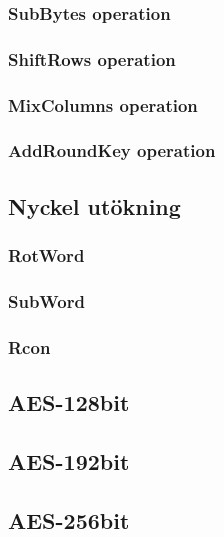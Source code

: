 \subsubsection{SubBytes operation}


\subsubsection{ShiftRows operation}


\subsubsection{MixColumns operation}


\subsubsection{AddRoundKey operation}


\subsection{Nyckel utökning}


\subsubsection{RotWord}


\subsubsection{SubWord}


\subsubsection{Rcon}


\subsection{AES-128bit}


\subsection{AES-192bit}


\subsection{AES-256bit}

